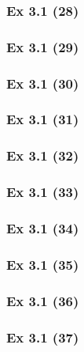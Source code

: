 \subsubsection{Ex 3.1 (28)}\label{sec:Ex_3.1.28}

\subsubsection{Ex 3.1 (29)}\label{sec:Ex_3.1.29}

\subsubsection{Ex 3.1 (30)}\label{sec:Ex_3.1.30}

\newpage		%
\subsubsection{Ex 3.1 (31)}\label{sec:Ex_3.1.31}

\subsubsection{Ex 3.1 (32)}\label{sec:Ex_3.1.32}

\subsubsection{Ex 3.1 (33)}\label{sec:Ex_3.1.33}

\subsubsection{Ex 3.1 (34)}\label{sec:Ex_3.1.34}

\subsubsection{Ex 3.1 (35)}\label{sec:Ex_3.1.35}

\subsubsection{Ex 3.1 (36)}\label{sec:Ex_3.1.36}

\subsubsection{Ex 3.1 (37)}\label{sec:Ex_3.1.37}

